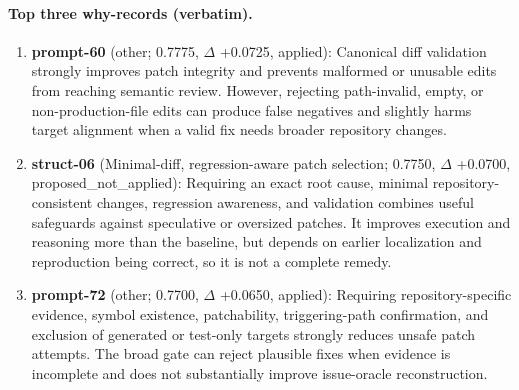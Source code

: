 \paragraph{Top three why-records (verbatim).}\begin{enumerate}\itemsep1pt
\item \textbf{prompt-60} (other; 0.7775, $\Delta$ +0.0725, applied): Canonical diff validation strongly improves patch integrity and prevents malformed or unusable edits from reaching semantic review. However, rejecting path-invalid, empty, or non-production-file edits can produce false negatives and slightly harms target alignment when a valid fix needs broader repository changes.
\item \textbf{struct-06} (Minimal-diff, regression-aware patch selection; 0.7750, $\Delta$ +0.0700, proposed\_not\_applied): Requiring an exact root cause, minimal repository-consistent changes, regression awareness, and validation combines useful safeguards against speculative or oversized patches. It improves execution and reasoning more than the baseline, but depends on earlier localization and reproduction being correct, so it is not a complete remedy.
\item \textbf{prompt-72} (other; 0.7700, $\Delta$ +0.0650, applied): Requiring repository-specific evidence, symbol existence, patchability, triggering-path confirmation, and exclusion of generated or test-only targets strongly reduces unsafe patch attempts. The broad gate can reject plausible fixes when evidence is incomplete and does not substantially improve issue-oracle reconstruction.
\end{enumerate}
